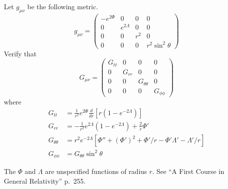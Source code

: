 \documentclass[12pt]{article}
\begin{document}
\noindent
Let $g_{\mu\nu}$ be the following metric.
$$
g_{\mu\nu}=
\begin{pmatrix}
-e^{2\Phi} & 0 & 0 & 0\\
0 & e^{2\Lambda} & 0 & 0\\
0 & 0 & r^2 & 0\\
0 & 0 & 0 & r^2\sin^2\theta
\end{pmatrix}
$$
Verify that
$$
G_{\mu\nu}=\begin{pmatrix}
G_{tt} & 0 & 0 & 0\\
0 & G_{rr} & 0 & 0\\
0 & 0 & G_{\theta\theta} & 0\\
0 & 0 & 0 & G_{\phi\phi}
\end{pmatrix}
$$
where
\begin{align*}
G_{tt}&=\frac{1}{r^2}e^{2\Phi}\frac{d}{dr}[r(1-e^{-2\Lambda})]
\\[2ex]
G_{rr}&=-\frac{1}{r^2}e^{2\Lambda}(1-e^{-2\Lambda})+\frac{2}{r}\Phi'
\\[2ex]
G_{\theta\theta}&=r^2e^{-2\Lambda}\left[\Phi''+(\Phi')^2+\Phi'/r-\Phi'\Lambda'-\Lambda'/r\right]
\\[2ex]
G_{\phi\phi}&=G_{\theta\theta}\sin^2\theta
\end{align*}

\noindent
The $\Phi$ and $\Lambda$ are unspecified functions of radius $r$.
See ``A First Course in General Relativity'' p.~255.
\end{document}
